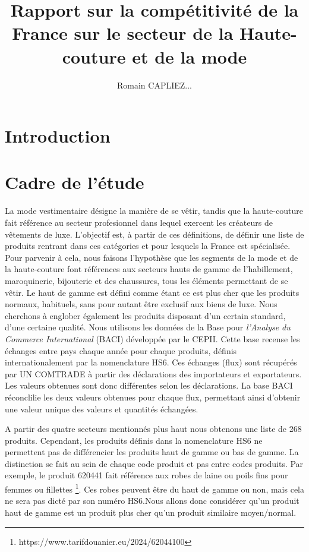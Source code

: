 \documentclass[french,10pt,a4paper]{article}
\title{Rapport sur la compétitivité de la France sur le secteur de la Haute-couture et de la mode}
\author{Romain CAPLIEZ...}
\begin{document}
\maketitle

\section{Introduction}

\newpage

\section{Cadre de l'étude}

La mode vestimentaire désigne la manière de se vêtir, tandis que la haute-couture fait référence au secteur profesionnel dans lequel exercent les créateurs de vêtements de luxe. L'objectif est, à partir de ces définitions, de définir une liste de produits rentrant dans ces catégories et pour lesquels la France est spécialisée. Pour parvenir à cela, nous faisons l'hypothèse que les segments de la mode et de la haute-couture font références aux secteurs hauts de gamme de l'habillement, maroquinerie, bijouterie et des chaussures, tous les éléments permettant de se vêtir. Le haut de gamme est défini comme étant ce est plus cher que les produits normaux, habituels, sans pour autant être exclusif aux biens de luxe. Nous cherchons à englober également les produits disposant d'un certain standard, d'une certaine qualité. Nous utilisons les données de la Base pour \textit{l'Analyse du Commerce International} (BACI) \cite{Gaulier2010} développée par le CEPII. Cette base recense les échanges entre pays chaque année pour chaque produits, définis internationalement par la nomenclature HS6. Ces échanges (flux) sont récupérés par UN COMTRADE à partir des déclarations des importateurs et exportateurs. Les valeurs obtenues sont donc différentes selon les déclarations. La base BACI réconclilie les deux valeurs obtenues pour chaque flux, permettant ainsi d'obtenir une valeur unique des valeurs et quantités échangées.  

A partir des quatre secteurs mentionnés plus haut nous obtenons une liste de 268 produits. Cependant, les produits définis dans la nomenclature HS6 ne permettent pas de différencier les produits haut de gamme ou bas de gamme. La distinction se fait au sein de chaque code produit et pas entre codes produits. Par exemple, le produit 620441 fait référence aux \og robes de laine ou poils fins pour femmes ou fillettes\fg{} \footnote{https://www.tarifdouanier.eu/2024/62044100}. Ces robes peuvent être du haut de gamme ou non, mais cela ne sera pas dicté par son numéro HS6.Nous allons donc considérer qu'un produit haut de gamme est un produit plus cher qu'un produit similaire moyen/normal.
\end{document}
